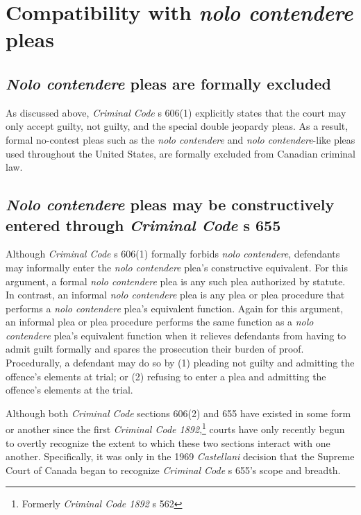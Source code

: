 \section{Compatibility with \textit{nolo contendere} pleas}

\subsection{\textit{Nolo contendere} pleas are formally excluded}

As discussed above, \textit{Criminal Code} s 606(1) explicitly states that the court may only accept guilty, not guilty, and the special double jeopardy pleas. As a result, formal no-contest pleas such as the \textit{nolo contendere} and \textit{nolo contendere}-like pleas used throughout the United States, are formally excluded from Canadian criminal law.

\subsection{\textit{Nolo contendere} pleas may be constructively entered through \textit{Criminal Code} s 655}

Although \textit{Criminal Code} s 606(1) formally forbids \textit{nolo contendere}, defendants may informally enter the \textit{nolo contendere} plea's constructive equivalent. For this argument, a formal \textit{nolo contendere} plea is any such plea authorized by statute. In contrast, an informal \textit{nolo contendere} plea is any plea or plea procedure that performs a \textit{nolo contendere} plea's equivalent function. Again for this argument, an informal plea or plea procedure performs the same function as a \textit{nolo contendere} plea's equivalent function when it relieves defendants from having to admit guilt formally and spares the prosecution their burden of proof. Procedurally, a defendant may do so by (1) pleading not guilty and admitting the offence's elements at trial; or (2) refusing to enter a plea and admitting the offence's elements at the trial.

Although both \textit{Criminal Code} sections 606(2) and 655 have existed in some form or another since the first \textit{Criminal Code 1892},\footnote{Formerly \textit{Criminal Code 1892} s 562} courts have only recently begun to overtly recognize the extent to which these two sections interact with one another. Specifically, it was only in the 1969 \textit{Castellani} decision that the Supreme Court of Canada began to recognize \textit{Criminal Code} s 655's scope and breadth.

